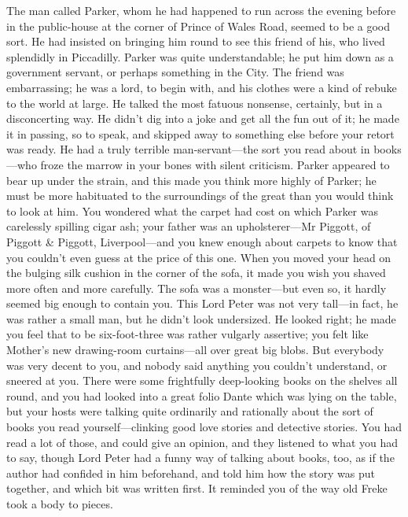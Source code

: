 The man called Parker, whom he had happened to run across the evening before in the public-house at the corner of Prince of Wales Road, seemed to be a good sort. He had insisted on bringing him round to see this friend of his, who lived splendidly in Piccadilly. Parker was quite understandable; he put him down as a government servant, or perhaps something in the City. The friend was embarrassing; he was a lord, to begin with, and his clothes were a kind of rebuke to the world at large. He talked the most fatuous nonsense, certainly, but in a disconcerting way. He didn't dig into a joke and get all the fun out of it; he made it in passing, so to speak, and skipped away to something else before your retort was ready. He had a truly terrible man-servant\allowbreak---\allowbreak the sort you read about in books\allowbreak---\allowbreak who froze the marrow in your bones with silent criticism. Parker appeared to bear up under the strain, and this made you think more highly of Parker; he must be more habituated to the surroundings of the great than you would think to look at him. You wondered what the carpet had cost on which Parker was carelessly spilling cigar ash; your father was an upholsterer\allowbreak---\allowbreak Mr Piggott, of Piggott \& Piggott, Liverpool\allowbreak---\allowbreak and you knew enough about carpets to know that you couldn't even guess at the price of this one. When you moved your head on the bulging silk cushion in the corner of the sofa, it made you wish you shaved more often and more carefully. The sofa was a monster\allowbreak---\allowbreak but even so, it hardly seemed big enough to contain you. This Lord Peter was not very tall\allowbreak---\allowbreak in fact, he was rather a small man, but he didn't look undersized. He looked right; he made you feel that to be six-foot-three was rather vulgarly assertive; you felt like Mother's new drawing-room curtains\allowbreak---\allowbreak all over great big blobs. But everybody was very decent to you, and nobody said anything you couldn't understand, or sneered at you. There were some frightfully deep-looking books on the shelves all round, and you had looked into a great folio Dante which was lying on the table, but your hosts were talking quite ordinarily and rationally about the sort of books you read yourself\allowbreak---\allowbreak clinking good love stories and detective stories. You had read a lot of those, and could give an opinion, and they listened to what you had to say, though Lord Peter had a funny way of talking about books, too, as if the author had confided in him beforehand, and told him how the story was put together, and which bit was written first. It reminded you of the way old Freke took a body to pieces.

